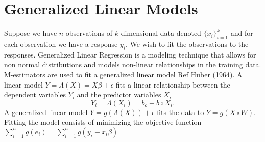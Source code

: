 \section{Generalized Linear Models}Suppose we have $n$ observations of $k$ dimensional data denoted $\{x_i\}_{i=1}^{k}$ and for each observation we have a response $y_i$. We wish to fit the observations to the responses. Generalized Linear Regression is a modeling technique that allows for non normal distributions and models non-linear relationships in the training data. M-estimators are used to fit a generalized linear model Ref Huber (1964).
A linear model $ Y =\Lambda(X)=X\beta + \epsilon$ fits a linear relationship between the dependent variables $Y_i$ and the predictor variables $X_i$ \begin{equation}Y_i=\Lambda(X_i)=b_o + b \circ X_i.\end{equation}
A generalized linear model $Y= g(\Lambda(X) ) + \epsilon $ fits the data to $ Y = g (X \circ W)$. Fitting the model consists of minimizing the objective function $\sum\limits_{i=1}^{n} g(e_i)=\sum\limits_{i=1}^{n} g(y_i- x_i \beta)$
